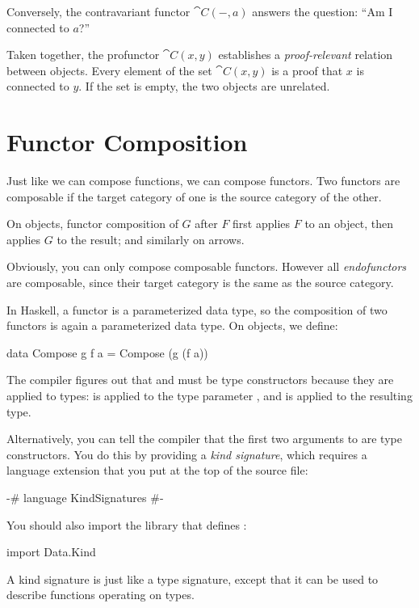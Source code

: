 \documentclass[DaoFP]{subfiles}
\begin{document}
Conversely, the contravariant functor $\cat C (-, a)$ answers the question: ``Am I connected to $a$?''

Taken together, the profunctor $\cat C(x, y)$ establishes a \emph{proof-relevant} relation between objects. Every element of the set $\cat C(x, y)$ is a proof that $x$ is connected to $y$. If the set is empty, the two objects are unrelated. 

\section{Functor Composition}

Just like we can compose functions, we can compose functors. Two functors are composable if the target category of one is the source category of the other.

 On objects, functor composition of $G$ after $F$ first applies $F$ to an object, then applies $G$ to the result; and similarly on arrows.
 
 Obviously, you can only compose composable functors. However all \emph{endofunctors} are composable, since their target category is the same as the source category.
 
 In Haskell, a functor is a parameterized data type, so the composition of two functors is again a parameterized data type. On objects, we define:
 \begin{haskell}
data Compose g f a = Compose (g (f a))
\end{haskell}
The compiler figures out that  and  must be type constructors because they are applied to types:  is applied to the type parameter , and  is applied to the resulting type.

Alternatively, you can tell the compiler that the first two arguments to  are type constructors. You do this by providing a \emph{kind signature}, which requires a language extension  that you put at the top of the source file:
\begin{haskell}
{-# language KindSignatures #-}
\end{haskell}
You should also import the  library that defines :
\begin{haskell}
import Data.Kind
\end{haskell}

A kind signature is just like a type signature, except that it can be used to describe functions operating on types. 
\end{document}
